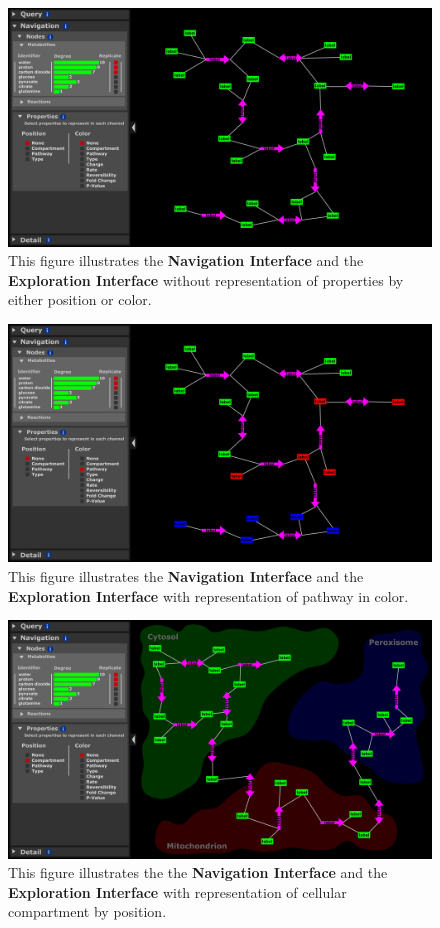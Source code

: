 \begin{figure}[htbp]
\includegraphics[scale=0.5]{sketch_2017-01-02_7}
\centering
\caption{This figure illustrates the \textbf{Navigation Interface} and the \textbf{Exploration Interface} without representation of properties by either position or color.}
\label{fig:2017-01-02_7}
\end{figure}

\begin{figure}[htbp]
\includegraphics[scale=0.5]{sketch_2017-01-02_8}
\centering
\caption{This figure illustrates the \textbf{Navigation Interface} and the \textbf{Exploration Interface} with representation of pathway in color.}
\label{fig:2017-01-02_8}
\end{figure}

\begin{figure}[htbp]
\includegraphics[scale=0.5]{sketch_2017-01-02_9}
\centering
\caption{This figure illustrates the the \textbf{Navigation Interface} and the \textbf{Exploration Interface} with representation of cellular compartment by position.}
\label{fig:2017-01-02_9}
\end{figure}

